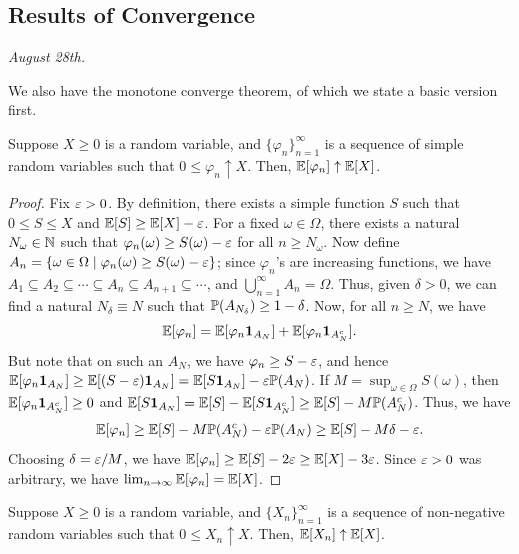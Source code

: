 \subsection{Results of Convergence}

\noindent \textit{August 28th.}

We also have the monotone converge theorem, of which we state a basic version first.

\begin{theorem}
    Suppose $X \geq 0$ is a random variable, and $\{\varphi_{n}\}_{n=1}^{\infty}$ is a sequence of simple random variables such that $0 \leq \varphi_{n} \uparrow X$. Then, $\mathbb{E}[\varphi_{n}] \uparrow \mathbb{E}[X]$.
\end{theorem}
\begin{proof}
    Fix $\varepsilon > 0$. By definition, there exists a simple function $S$ such that $0 \leq S \leq X$ and $\mathbb{E}[S] \geq \mathbb{E}[X] - \varepsilon$. For a fixed $\omega \in \Omega$, there exists a natural $N_{\omega} \in \mathbb{N}$ such that $\varphi_{n}(\omega) \geq S(\omega)-\varepsilon$ for all $n \geq N_{\omega}$. Now define $A_{n} = \{\omega \in \Omega \mid \varphi_{n}(\omega) \geq S(\omega)-\varepsilon\}$; since $\varphi_{n}$'s are increasing functions, we have $A_{1} \subseteq A_{2} \subseteq \cdots \subseteq A_{n} \subseteq A_{n+1} \subseteq \cdots$, and $\bigcup_{n=1}^{\infty} A_{n} = \Omega$. Thus, given $\delta > 0$, we can find a natural $N_{\delta} \equiv N$ such that $\mathbb{P}(A_{N_{\delta}}) \geq 1-\delta$. Now, for all $n \geq N$, we have
    \begin{align}
        \mathbb{E}[\varphi_{n}] = \mathbb{E}[\varphi_{n} \textbf{1}_{A_{N}}] + \mathbb{E}[\varphi_{n} \textbf{1}_{A_{N}^{c}}].
    \end{align}
    But note that on such an $A_{N}$, we have $\varphi_{n} \geq S-\varepsilon$, and hence $\mathbb{E}[\varphi_{n} \textbf{1}_{A_{N}}] \geq \mathbb{E}[(S-\varepsilon)\textbf{1}_{A_{N}}] = \mathbb{E}[S\textbf{1}_{A_{N}}] - \varepsilon\mathbb{P}(A_{N})$. If $M = \sup_{\omega \in \Omega} S(\omega)$, then $\mathbb{E}[\varphi_{n} \textbf{1}_{A_{N}^{c}}] \geq 0$ and $\mathbb{E}[S\textbf{1}_{A_{N}}] = \mathbb{E}[S] - \mathbb{E}[S\textbf{1}_{A_{N}^{c}}] \geq \mathbb{E}[S] - M\mathbb{P}(A_{N}^{c})$. Thus, we have
    \begin{align}
        \mathbb{E}[\varphi_{n}] \geq \mathbb{E}[S] - M\mathbb{P}(A_{N}^{c}) - \varepsilon\mathbb{P}(A_{N}) \geq \mathbb{E}[S] - M\delta - \varepsilon.
    \end{align}
    Choosing $\delta = \varepsilon/M$, we have $\mathbb{E}[\varphi_{n}] \geq \mathbb{E}[S] - 2\varepsilon \geq \mathbb{E}[X] - 3\varepsilon$. Since $\varepsilon > 0$ was arbitrary, we have $\lim_{n \to \infty} \mathbb{E}[\varphi_{n}] = \mathbb{E}[X]$.
\end{proof}

\begin{theorem}
    Suppose $X \geq 0$ is a random variable, and $\{X_{n}\}_{n=1}^{\infty}$ is a sequence of non-negative random variables such that $0 \leq X_{n} \uparrow X$. Then, $\mathbb{E}[X_{n}] \uparrow \mathbb{E}[X]$.
\end{theorem}

